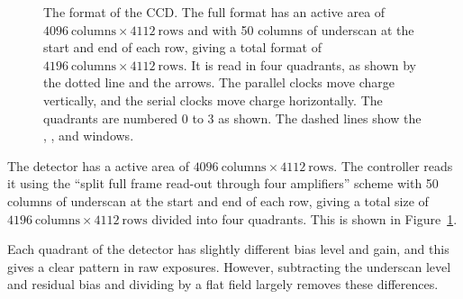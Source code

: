 \begin{figure}[p]
\begin{center}
\caption{The format of the CCD. The full format has an active area of $4096~\mbox{columns} \times 4112~\mbox{rows}$ and with 50 columns of underscan at the start and end of each row, giving a total format of $4196~\mbox{columns} \times 4112~\mbox{rows}$. It is read in four quadrants, as shown by the dotted line and the arrows. The parallel clocks move charge vertically, and the serial clocks move charge horizontally. The quadrants are numbered 0 to 3 as shown. The dashed lines show the , , and  windows.}
\label{figure:format}
\end{center}
\end{figure}

The detector has a active area of  $4096~\mbox{columns} \times 4112~\mbox{rows}$. The controller reads it using the “split full frame read-out through four amplifiers” scheme \citep[p.~17]{e2v} with 50 columns of underscan at the start and end of each row, giving a total size of $4196~\mbox{columns} \times 4112~\mbox{rows}$ divided into four quadrants. This is shown in Figure~\ref{figure:format}.

Each quadrant of the detector has slightly different bias level and gain, and this gives a clear pattern in raw exposures. However, subtracting the underscan level and residual bias and dividing by a flat field largely removes these differences.

